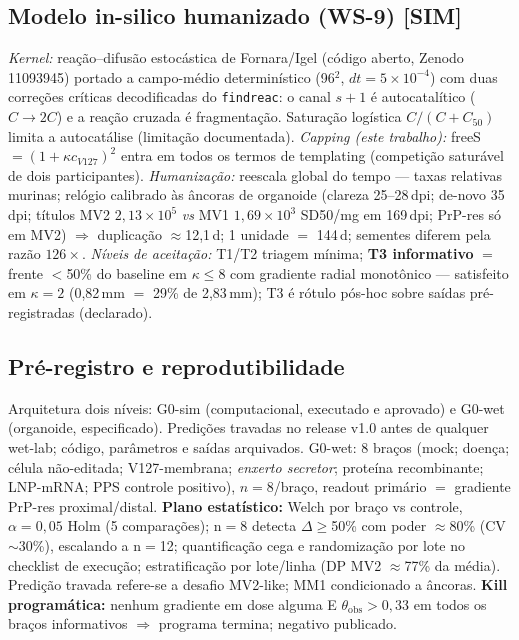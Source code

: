 \documentclass[10pt,twocolumn]{article}
\begin{document}
\subsection{Modelo in-silico humanizado (WS-9) [SIM]}
\emph{Kernel:} reação--difusão estocástica de Fornara/Igel (código aberto, Zenodo 11093945) portado a campo-médio determinístico (96$^2$, $dt{=}5{\times}10^{-4}$) com duas correções críticas decodificadas do \texttt{findreac}: o canal $s{+}1$ é autocatalítico ($C{\to}2C$) e a reação cruzada é fragmentação. Saturação logística $C/(C+C_{50})$ limita a autocatálise (limitação documentada). \emph{Capping (este trabalho):} freeS $=(1+\kappa c_{V127})^2$ entra em todos os termos de templating (competição saturável de dois participantes). \emph{Humanização:} reescala global do tempo --- taxas relativas murinas; relógio calibrado às âncoras de organoide (clareza 25--28\,dpi; de-novo 35\,dpi; títulos MV2 $2,13{\times}10^5$ \emph{vs} MV1 $1,69{\times}10^3$ SD50/mg em 169\,dpi; PrP-res só em MV2) $\Rightarrow$ duplicação $\approx$12,1\,d; 1 unidade $=$ 144\,d; sementes diferem pela razão $126\times$. \emph{Níveis de aceitação:} T1/T2 triagem mínima; \textbf{T3 informativo} $=$ frente $<$50\% do baseline em $\kappa\le8$ com gradiente radial monotônico --- satisfeito em $\kappa{=}2$ (0,82\,mm $=$ 29\% de 2,83\,mm); T3 é rótulo pós-hoc sobre saídas pré-registradas (declarado).

\subsection{Pré-registro e reprodutibilidade}
Arquitetura dois níveis: G0-sim (computacional, executado e aprovado) e G0-wet (organoide, especificado). Predições travadas no release v1.0 antes de qualquer wet-lab; código, parâmetros e saídas arquivados. G0-wet: 8 braços (mock; doença; célula não-editada; V127-membrana; \emph{enxerto secretor}; proteína recombinante; LNP-mRNA; PPS controle positivo), $n{=}8$/braço, readout primário $=$ gradiente PrP-res proximal/distal. \textbf{Plano estatístico:} Welch por braço vs controle, $\alpha{=}0,05$ Holm (5 comparações); n$=$8 detecta $\Delta\ge$50\% com poder $\approx$80\% (CV$\sim$30\%), escalando a n$=$12; quantificação cega e randomização por lote no checklist de execução; estratificação por lote/linha (DP MV2 $\approx$77\% da média). Predição travada refere-se a desafio MV2-like; MM1 condicionado a âncoras. \textbf{Kill programática:} nenhum gradiente em dose alguma E $\theta_{\text{obs}}>0,33$ em todos os braços informativos $\Rightarrow$ programa termina; negativo publicado.
\end{document}
